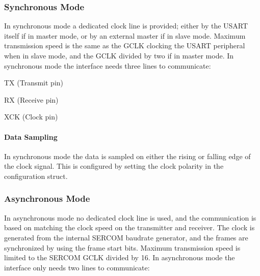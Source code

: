 \label{group__asfdoc__sam0__sercom__usart__group_asfdoc_sam0_sercom_usart_frame_diagram}%
\hypertarget{group__asfdoc__sam0__sercom__usart__group_asfdoc_sam0_sercom_usart_frame_diagram}{}%
\hypertarget{group__asfdoc__sam0__sercom__usart__group_asfdoc_sam0_sercom_usart_overview_sync}{}\subsubsection{Synchronous Mode}\label{group__asfdoc__sam0__sercom__usart__group_asfdoc_sam0_sercom_usart_overview_sync}
In synchronous mode a dedicated clock line is provided; either by the U\+S\+A\+R\+T itself if in master mode, or by an external master if in slave mode. Maximum transmission speed is the same as the G\+C\+L\+K clocking the U\+S\+A\+R\+T peripheral when in slave mode, and the G\+C\+L\+K divided by two if in master mode. In synchronous mode the interface needs three lines to communicate\+:
\begin{DoxyItemize}
\item T\+X (Transmit pin)
\item R\+X (Receive pin)
\item X\+C\+K (Clock pin)
\end{DoxyItemize}\hypertarget{group__asfdoc__sam0__sercom__usart__group_asfdoc_sam0_sercom_usart_overview_sync_sampling}{}\paragraph{Data Sampling}\label{group__asfdoc__sam0__sercom__usart__group_asfdoc_sam0_sercom_usart_overview_sync_sampling}
In synchronous mode the data is sampled on either the rising or falling edge of the clock signal. This is configured by setting the clock polarity in the configuration struct.\hypertarget{group__asfdoc__sam0__sercom__usart__group_asfdoc_sam0_sercom_usart_overview_async}{}\subsubsection{Asynchronous Mode}\label{group__asfdoc__sam0__sercom__usart__group_asfdoc_sam0_sercom_usart_overview_async}
In asynchronous mode no dedicated clock line is used, and the communication is based on matching the clock speed on the transmitter and receiver. The clock is generated from the internal S\+E\+R\+C\+O\+M baudrate generator, and the frames are synchronized by using the frame start bits. Maximum transmission speed is limited to the S\+E\+R\+C\+O\+M G\+C\+L\+K divided by 16. In asynchronous mode the interface only needs two lines to communicate\+:
